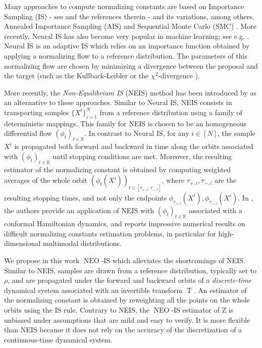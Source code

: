 \documentclass{article}
\def\IFIS{\ensuremath{\operatorname{NEO}}}
\def\transfo{\operatorname{T}}
\def\rset{\mathbb{R}}
\newcommand{\1}{\mathds{1}}
\def\proposal{\rho}
\def\rset{\mathbb{R}}
\begin{document}
Many approaches to compute normalizing constants are based on Importance Sampling (IS) - see \cite{agapiou2017importance,akyildiz2021convergence} and the references therein - and its variations, among others, Annealed Importance Sampling (AIS) \citep{neal-annealed:2001,wu:burda:grosse:2016,ding2019learning} and Sequential Monte Carlo (SMC) \citep{del2006sequential}. More recently, Neural IS has also become very popular in machine learning; see e.g. \cite{el2012bayesian,muller2018neural,papamakarios2019normalizing,prangle2019distilling,wirnsberger2020targeted}. Neural IS is an adaptive IS which relies on an importance function obtained by applying a normalizing flow to a reference distribution. The parameters of this normalizing flow are chosen by minimizing a divergence between the proposal and the target (such as the Kullback-Leibler \cite{muller2018neural} or the $\chi^2$-divergence \cite{agapiou2017importance}).

More recently, the \emph{Non-Equilibrium IS} (NEIS) method has been introduced by \cite{rotskoff:vanden-eijden:2019} as an alternative to these approaches. Similar to Neural IS, NEIS consists in transporting samples $\{X^i\}_{i=1}^N$ from a reference distribution using a family of deterministic mappings. This family for NEIS is chosen to be an homogeneous differential flow $(\phi_t)_{t \in \rset}$. In contrast to Neural IS, for any $i \in [N]$, the sample $X^i$ is propagated both forward and backward in time  along the orbits associated with $(\phi_t)_{t \in \rset}$ until stopping conditions are met. Moreover, the resulting estimator of the normalizing constant is obtained by computing weighted averages of the whole orbit $(\phi_t(X^i))_{t \in [\tau_{+,i},\tau_{-,i}]}$, where $\tau_{+,i},\tau_{-,i}$ are the resulting stopping times, and not only the endpoints $\phi_{\tau_{+,i}}(X^i),\phi_{\tau_{-,i}}(X^i)$. In \cite{rotskoff:vanden-eijden:2019}, the authors  provide an application of NEIS with $(\phi_t)_{t \in \rset}$ associated with a conformal Hamiltonian dynamics, and reports impressive numerical results on difficult  normalizing constants estimation problems, in particular for high-dimensional multimodal distributions. 


We propose in this work \IFIS-IS which alleviates the shortcomings of NEIS. Similar to NEIS, samples are drawn from a reference distribution, typically set to $\proposal$, and are propagated under the forward and backward orbits of a \emph{discrete-time} dynamical system associated with an invertible transform $\transfo$. An estimator of the normalizing constant is obtained by reweighting all the points on the whole orbits using the IS rule. 
Contrary to  NEIS, the \IFIS-IS estimator of $\mathrm{Z}$ is unbiased under assumptions that are mild and easy to verify. It is more flexible than NEIS because it does not rely on the accuracy of the  discretization of a continuous-time dynamical system. 
\end{document}
